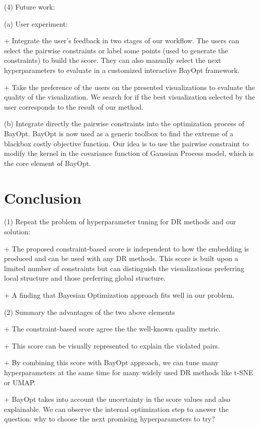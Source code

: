\vspace{8pt}
\par (4) Future work:

(a) User experiment:

+ Integrate the user's feedback in two stages of our workflow.
The users can select the pairwise constraints or label some points (used to generate the constraints) to build the score.
They can also manually select the next hyperparameters to evaluate in a customized interactive BayOpt framework.

+ Take the preference of the users on the presented visualizations to evaluate the quality of the visualization. We search for if the best visualization selected by the user corresponds to the result of our method.


(b) Integrate directly the pairwise constraints into the optimization process of BayOpt.
BayOpt is now used as a generic toolbox to find the extreme of a blackbox costly objective function.
Our idea is to use the pairwise constraint to modify the kernel in the covariance function of Gaussian Process model, which is the core element of BayOpt.


\section{Conclusion}

\par (1) Repeat the problem of hyperparameter tuning for DR methods and our solution:

+ The proposed constraint-based score is independent to how the embedding is produced and can be used with any DR methods.
This score is built upon a limited number of constraints but can distinguish the visualizations preferring local structure and those preferring global structure.

+ A finding that Bayesian Optimization approach fits well in our problem.


\vspace{8pt}
\par (2) Summary the advantages of the two above elements

+ The constraint-based score agree the the well-known quality metric.

+ This score can be visually represented to explain the violated pairs.

+ By combining this score with BayOpt approach, we can tune many hyperparameters at the same time for many widely used DR methods like t-SNE or UMAP.

+ BayOpt takes into account the uncertainty in the score values and also explainable. We can observe the internal optimization step to answer the question: why to choose the next promising hyperparameters to try?